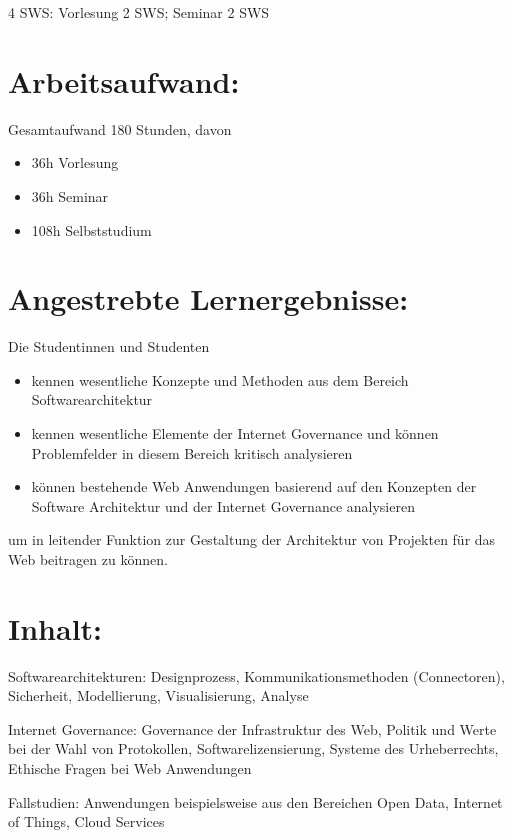 4 SWS: Vorlesung 2 SWS; Seminar 2 SWS

\section*{Arbeitsaufwand:}\label{arbeitsaufwand-23}

Gesamtaufwand 180 Stunden, davon

\begin{itemize}
\tightlist
\item
  36h Vorlesung
\item
  36h Seminar
\item
  108h Selbststudium
\end{itemize}

\section*{Angestrebte
Lernergebnisse:}\label{angestrebte-lernergebnisse-22}

Die Studentinnen und Studenten

\begin{itemize}
\tightlist
\item
  kennen wesentliche Konzepte und Methoden aus dem Bereich
  Softwarearchitektur
\item
  kennen wesentliche Elemente der Internet Governance und können
  Problemfelder in diesem Bereich kritisch analysieren
\item
  können bestehende Web Anwendungen basierend auf den Konzepten der
  Software Architektur und der Internet Governance analysieren
\end{itemize}

um in leitender Funktion zur Gestaltung der Architektur von Projekten
für das Web beitragen zu können.

\section*{Inhalt:}\label{inhalt-22}

Softwarearchitekturen: Designprozess, Kommunikationsmethoden
(Connectoren), Sicherheit, Modellierung, Visualisierung, Analyse

Internet Governance: Governance der Infrastruktur des Web, Politik und
Werte bei der Wahl von Protokollen, Softwarelizensierung, Systeme des
Urheberrechts, Ethische Fragen bei Web Anwendungen

Fallstudien: Anwendungen beispielsweise aus den Bereichen Open Data,
Internet of Things, Cloud Services

